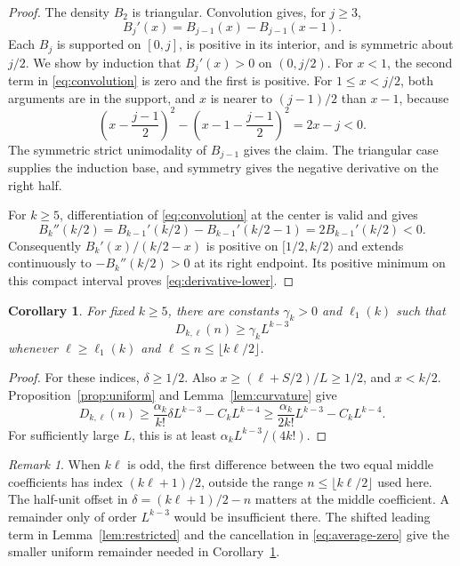 \documentclass[3p,11pt,number]{elsarticle}
\newtheorem{corollary}[theorem]{Corollary}
\theoremstyle{remark}
\newtheorem{remark}[theorem]{Remark}
\numberwithin{equation}{section}
\begin{document}
\begin{proof}
The density \(B_2\) is triangular. Convolution gives, for \(j\ge3\),
\begin{equation}\label{eq:convolution}
B_j'(x)=B_{j-1}(x)-B_{j-1}(x-1).
\end{equation}
Each \(B_j\) is supported on \([0,j]\), is positive in its interior,
and is symmetric about \(j/2\).
We show by induction that \(B_j'(x)>0\) on \((0,j/2)\).
For \(x<1\), the second term in \eqref{eq:convolution} is zero and
the first is positive. For \(1\le x<j/2\), both arguments are in
the support, and \(x\) is nearer to \((j-1)/2\) than \(x-1\), because
\[
\left(x-\frac{j-1}{2}\right)^2
-\left(x-1-\frac{j-1}{2}\right)^2=2x-j<0.
\]
The symmetric strict unimodality of \(B_{j-1}\) gives the claim.
The triangular case supplies the induction base, and symmetry
gives the negative derivative on the right half.

For \(k\ge5\), differentiation of \eqref{eq:convolution} at the
center is valid and gives
\[
B_k''(k/2)=
B_{k-1}'(k/2)-B_{k-1}'(k/2-1)
=2B_{k-1}'(k/2)<0.
\]
Consequently \(B_k'(x)/(k/2-x)\) is positive on
\([1/2,k/2)\) and extends continuously to
\(-B_k''(k/2)>0\) at its right endpoint.
Its positive minimum on this compact interval proves
\eqref{eq:derivative-lower}.
\end{proof}

\begin{corollary}\label{cor:bulk}
For fixed \(k\ge5\), there are constants \(\gamma_k>0\) and
\(\ell_1(k)\) such that
\begin{equation}\label{eq:bulk-lower}
D_{k,\ell}(n)\ge\gamma_k L^{k-3}
\end{equation}
whenever \(\ell\ge\ell_1(k)\) and
\(\ell\le n\le\lfloor k\ell/2\rfloor\).
\end{corollary}

\begin{proof}
For these indices, \(\delta\ge1/2\).
Also \(x\ge(\ell+S/2)/L\ge1/2\), and \(x<k/2\).
Proposition~\ref{prop:uniform} and Lemma~\ref{lem:curvature} give
\[
D_{k,\ell}(n)
\ge\frac{\alpha_k}{k!}\delta L^{k-3}-C_kL^{k-4}
\ge\frac{\alpha_k}{2k!}L^{k-3}-C_kL^{k-4}.
\]
For sufficiently large \(L\), this is at least
\(\alpha_kL^{k-3}/(4k!)\).
\end{proof}

\begin{remark}
When \(k\ell\) is odd, the first difference between the two equal
middle coefficients has index \((k\ell+1)/2\), outside the range
\(n\le\lfloor k\ell/2\rfloor\) used here.
The half-unit offset in
\(\delta=(k\ell+1)/2-n\) matters at the middle coefficient.
A remainder only of order \(L^{k-3}\) would be insufficient there.
The shifted leading term in Lemma~\ref{lem:restricted} and the
cancellation in \eqref{eq:average-zero} give the smaller uniform
remainder needed in Corollary~\ref{cor:bulk}.
\end{remark}
\end{document}
